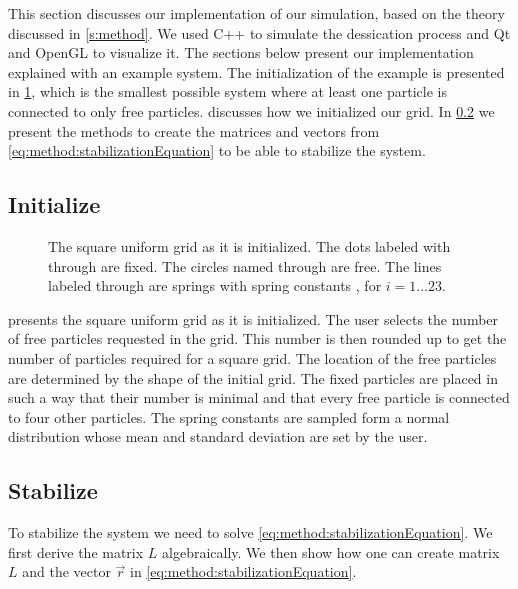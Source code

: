 This section discusses our implementation of our simulation, based on the theory discussed in \cref{s:method}. We used C++ to simulate the dessication process and  Qt\cite{qt} and OpenGL\cite{openGL} to visualize it. The sections below present our implementation explained with an example system. The initialization of the example is presented in \cref{fig:implementation:intitialGrid}, which is the smallest possible system where at least one particle is connected to only free particles.  discusses how we initialized our grid. In \cref{s:implementation:stabilize} we present the methods to create the matrices and vectors from \cref{eq:method:stabilizationEquation} to be able to stabilize the system. 

\subsection{Initialize}
	\label{s:implementation:init}
	\begin{figure}
		\centering
		\resizebox{0.9\columnwidth}{!}{%
			\initialGrid
		}
		\caption{The square uniform grid as it is initialized. The dots labeled with  through  are fixed. The circles named  through  are free. The lines labeled  through  are springs with spring constants , for $i = 1\ldots23$.}
		\label{fig:implementation:intitialGrid}
	\end{figure}

	 presents the square uniform grid as it is initialized. 
	The user selects the number of free particles requested in the grid. This number is then rounded up to get the number of particles required for a square grid. The location of the free particles are determined by the shape of the initial grid.
	The fixed particles are placed  in such a way that their number is minimal and that every free particle is connected to four other particles. 
	The spring constants are sampled form a normal distribution whose mean and standard deviation are set by the user. 

\subsection{Stabilize}
	\label{s:implementation:stabilize}
	To stabilize the system we need to solve \cref{eq:method:stabilizationEquation}. We first derive the matrix $L$ algebraically. We then show how one can create matrix $L$ and the vector $\vec{r}$ in \cref{eq:method:stabilizationEquation}.

